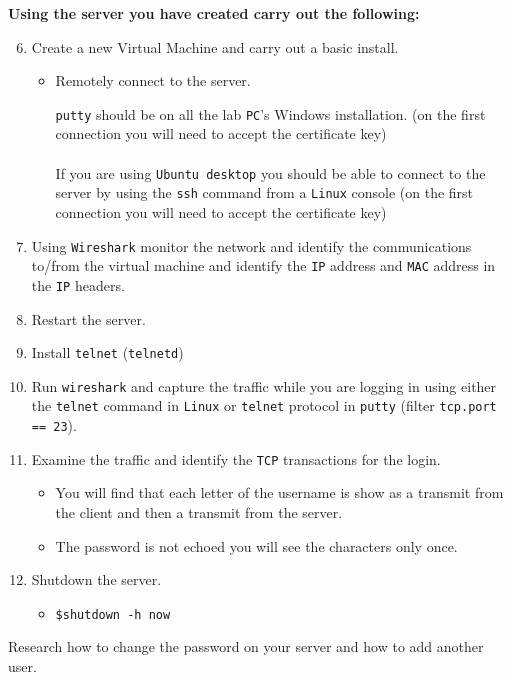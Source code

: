 \documentclass[11pt]{article}
\begin{document}
    \noindent \textbf{Using the server you have created carry out the following:}
    \begin{enumerate}
        \setcounter{enumi}{5}
        \item Create a new Virtual Machine and carry out a basic install.
            \begin{itemize}
                \item Remotely connect to the server.
                    \begin{tcolorbox}[title={\textbf{Note:}}]
                        \texttt{putty} should be on all the lab \texttt{PC}'s Windows installation. (on the first connection you will need to accept the certificate key)\\~\\
                        If you are using \texttt{Ubuntu desktop} you should be able to connect to the server by using the \texttt{ssh} command from a \texttt{Linux} console (on the first connection you will need to accept the certificate key)
                    \end{tcolorbox}
            \end{itemize}
        \item Using \texttt{Wireshark} monitor the network and identify the communications to/from the virtual machine and identify the \texttt{IP} address and \texttt{MAC} address in the \texttt{IP} headers.
        \item Restart the server.
        \item Install \texttt{telnet} (\texttt{telnetd})
        \item Run \texttt{wireshark} and capture the traffic while you are logging in using either the \texttt{telnet} command in \texttt{Linux} or \texttt{telnet} protocol in \texttt{putty} (filter \texttt{tcp.port == 23}).
        \item Examine the traffic and identify the \texttt{TCP} transactions for the login.
            \begin{itemize}
                \item You will find that each letter of the username is show as a transmit from the client and then a transmit from the server.
                \item The password is not echoed you will see the characters only once.
            \end{itemize}
        \item Shutdown the server.
            \begin{itemize}
                \item \texttt{\$shutdown -h now}
            \end{itemize}
    \end{enumerate}
    \begin{tcolorbox}[title={\textbf{TIME PERMITTING:}}]
        Research how to change the password on your server and how to add another user.
    \end{tcolorbox}
\end{document}
